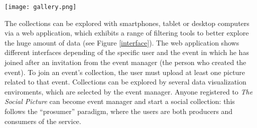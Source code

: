 \begin{figure*}[t]
	\centering
	\texttt{[image: gallery.png]}
	\caption{Example of exploration interface. It is composed by three main areas: the gallery (right part) shows the collection's pictures according to the selected filters (middle) which allows the users to explore the collection. By selecting an image the system shows all the extracted information and the computed inferences (i.e., objects, places, similar images, if there is food, etc.). The filters allow to customize the set of images shown in the gallery. The menu (left) allows to select the visualization tool of the framework.}
	\label{interface}
\end{figure*}
The collections can be explored with smartphones, tablet or desktop computers via a web application, which exhibits a range of filtering tools to better explore the huge amount of data (see Figure \ref{interface}).
The web application shows different interfaces depending of the specific user and the event in which he has joined after an invitation from the event manager (the person who created the event). To join an event's collection, the user must upload at least one picture related to that event. Collections can be explored by several data visualization enviroments, which are selected by the event manager. Anyone registered to \textit{The Social Picture} can become event manager and start a social collection: this follows the ``prosumer'' paradigm, where the users are both producers and consumers of the service.
